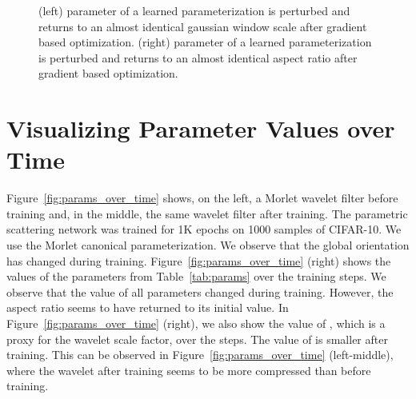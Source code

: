\documentclass[10pt,twocolumn,letterpaper]{article}
\begin{document}
\begin{table*}[t]
\begin{figure}
\centering
\small
\noindent{}
    \caption{(left)   parameter of a learned parameterization is perturbed and returns to an almost identical gaussian window scale after gradient based optimization. (right)  parameter of a learned parameterization is perturbed and returns to an almost identical aspect ratio after gradient based optimization.}
    \label{fig:pert2}
\end{figure}



\clearpage
\section{Visualizing Parameter Values over Time}

 Figure~\ref{fig:params_over_time} shows, on the left, a Morlet wavelet filter before training and, in the middle, the same wavelet filter after training. The parametric scattering network was trained for 1K epochs on 1000 samples of CIFAR-10. We use the Morlet canonical parameterization. We observe that the global orientation has changed during training. Figure~\ref{fig:params_over_time} (right) shows the values of the parameters from Table~\ref{tab:params} over the training steps. We observe that the value of all parameters changed during training. However, the aspect ratio seems to have returned to its initial value. In Figure~\ref{fig:params_over_time} (right), we also show the value of , which is a proxy for the wavelet scale factor, over the steps. The value of  is smaller after training. This can be observed in Figure~\ref{fig:params_over_time} (left-middle), where the wavelet after training seems to be more compressed than before training.


\end{table*}
\end{document}
